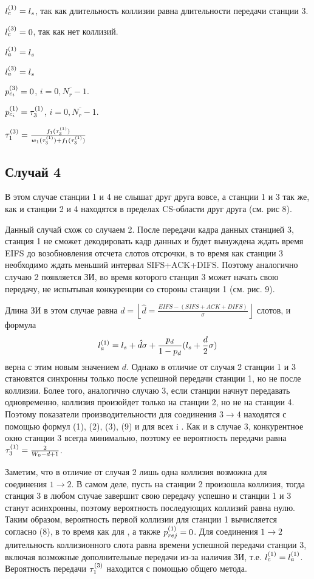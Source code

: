 {$l_{c}^{(1)} = l_s$, так как длительность коллизии равна длительности передачи станции 3.

$l_{c}^{(3)} = 0$, так как нет коллизий.

$l_{a}^{(1)} = l_s$

$l_{a}^{(3)} = l_s$

$p_{c_{i}}^{(3)} = 0$, $i = \overline{0,N_r-1}$.

$p_{c_{i}}^{(1)} = \tau_{3}^{(1)}$, $i = \overline{0,N_r-1}$.

$\tau_{1}^{(3)} = \frac{f_1(\tau_{3}^{(1)})}{w_1(\tau_{3}^{(1)})+f_1(\tau_{3}^{(1)})}$

\subsection{Случай 4}
В этом случае станции 1 и 4 не слышат друг друга вовсе, а станции 1 и 3 так же, как и станции 2 и 4 находятся в пределах CS-области друг друга (см. рис 8).

Данный случай схож со случаем 2. После передачи кадра данных станцией 3, станция 1 не сможет декодировать кадр данных и будет вынуждена ждать время EIFS до возобновления отсчета слотов отсрочки, в то время как станции 3 необходимо ждать меньший интервал SIFS+ACK+DIFS. Поэтому аналогично случаю 2 появляется ЗИ, во время которого станция 3 может начать свою передачу, не испытывая конкуренции со стороны станции 1 (см. рис. 9).

Длина ЗИ в этом случае равна $d = \left\lfloor \hat{d} = \frac{EIFS - (SIFS + ACK + DIFS)}{\sigma}\right\rfloor$ слотов, и формула 
\begin{equation}
l_{a}^{(1)} = l_s + \hat{d}\sigma + \frac{p_d}{1-p_d}(l_s+\frac{d}{2}\sigma)
\end{equation}
верна с этим новым значением $d$. Однако в отличие от случая 2 станции 1 и 3 становятся синхронны только после успешной  передачи станции 1, но не после коллизии. Более того, аналогично случаю 3, если станции начнут передавать одновременно, коллизия произойдет только на станции 2, но не на станции 4. Поэтому показатели производительности для соединения $3\rightarrow 4$ находятся с помощью формул (1), (2), (3), (9) и  для всех i . Как и в случае 3, конкурентное окно станции 3 всегда минимально, поэтому ее вероятность передачи равна $\tau_{3}^{(1)} = \frac{2}{W_0-d+1}$.

Заметим, что в отличие от случая 2 лишь одна коллизия возможна для соединения $1\rightarrow 2$. В самом деле, пусть на станции 2 произошла коллизия, тогда станция 3 в любом случае завершит свою передачу успешно и станции 1 и 3 станут асинхронны, поэтому вероятность последующих коллизий равна нулю. Таким образом, вероятность  первой коллизии для станции 1 вычисляется согласно (8), в то время как  для , а также $p_{rej}^{(1)} = 0$. Для соединения $1 \rightarrow 2$ длительность коллизионного слота равна времени успешной передачи станции 3, включая возможные дополнительные передачи из-за наличия ЗИ, т.е. $l_{c}^{(1)} = l_{a}^{(1)}$. Вероятность передачи $\tau_{1}^{(3)}$ находится с помощью общего метода.

}
